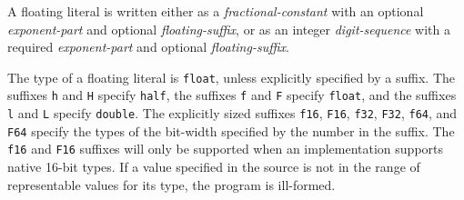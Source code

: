 \p A floating literal is written either as a \textit{fractional-constant} with
an optional \textit{exponent-part} and optional \textit{floating-suffix}, or as
an integer \textit{digit-sequence} with a required \textit{exponent-part} and
optional \textit{floating-suffix}.

\p The type of a floating literal is \texttt{float}, unless explicitly specified
by a suffix. The suffixes \texttt{h} and \texttt{H} specify \texttt{half}, the
suffixes \texttt{f} and \texttt{F} specify \texttt{float}, and the suffixes
\texttt{l} and \texttt{L} specify \texttt{double}. The explicitly sized suffixes
\texttt{f16}, \texttt{F16}, \texttt{f32}, \texttt{F32}, \texttt{f64}, and
\texttt{F64} specify the types of the bit-width specified by the number in the
suffix. The \texttt{f16} and \texttt{F16} suffixes will only be supported when
an implementation supports native 16-bit types. If a value specified in the
source is not in the range of representable values for its type, the program is
ill-formed.
